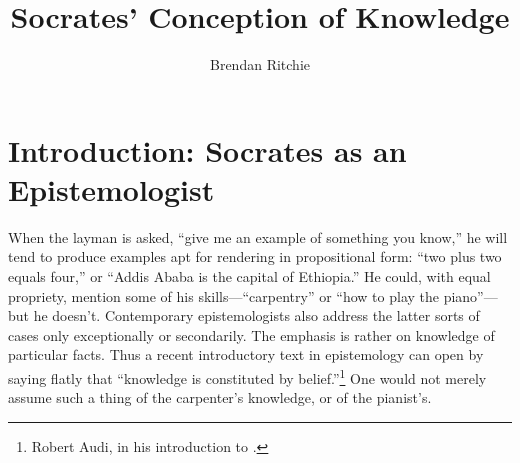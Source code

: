 \documentclass[11pt,letterpaper,oneside]{amsart} %
\author{Brendan Ritchie}
\title{Socrates' Conception of Knowledge}
\begin{document}
\maketitle






\section{Introduction: Socrates as an Epistemologist}

When the layman is asked, ``give me an example of something you know,'' he will tend to produce examples apt for rendering in propositional form: ``two plus two equals four,'' or ``Addis Ababa is the capital of Ethiopia.'' He could, with equal propriety, mention some of his skills---``carpentry'' or ``how to play the piano''---but he doesn't. Contemporary epistemologists also address the latter sorts of cases only exceptionally or secondarily. The emphasis is rather on knowledge of particular facts. Thus a recent introductory text in epistemology can open by saying flatly that ``knowledge is constituted by belief.''\footnote{Robert Audi, in his introduction to \citet[p.\ 1]{huemer2002ecr}.} One would not merely assume such a thing of the carpenter's knowledge, or of the pianist's.



\end{document}
